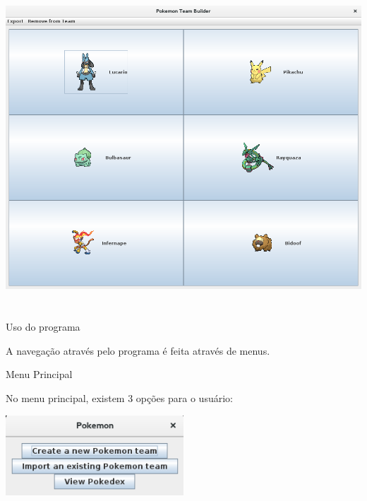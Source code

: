 \documentclass[
	article,			%
	12pt,				%
	oneside,			%
	a4paper,			%
	english,			%
	brazil,				%
	sumario=tradicional
	]{abntex2}
\begin{document}
\begin{center}
\includegraphics[width=1\textwidth]{team_full}\par\vspace{1cm}
\end{center}




\newpage
\section*{}

\begin{center}
{\HUGE Uso do programa}
\end{center}

A navegação através pelo programa é feita através de menus.

\begin{center}
{\Large Menu Principal}
\end{center}

No menu principal, existem 3 opções para o usuário:

\begin{center}
\includegraphics[width=0.5\textwidth]{menu}\par\vspace{1cm}
\end{center}
\end{document}
